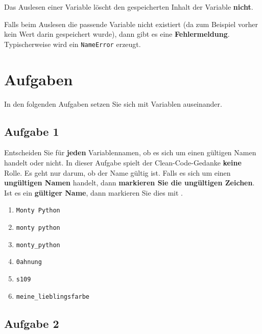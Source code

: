 \begin{important}
	Das Auslesen einer Variable löscht den gespeicherten Inhalt der Variable \textbf{nicht}.
\end{important}

\begin{hinweis}
	Falls beim Auslesen die passende Variable nicht existiert (da zum Beispiel vorher kein Wert darin gespeichert wurde), dann gibt es eine \textbf{Fehlermeldung}. Typischerweise wird ein \texttt{NameError} erzeugt.
\end{hinweis}


\section{Aufgaben}

In den folgenden Aufgaben setzen Sie sich mit Variablen auseinander.

\subsection{Aufgabe 1}

Entscheiden Sie für \textbf{jeden} Variablennamen, ob es sich um einen gültigen Namen handelt oder nicht. In dieser Aufgabe spielt der Clean-Code-Gedanke \textbf{keine} Rolle. Es geht nur darum, ob der Name gültig ist. Falls es sich um einen \textbf{ungültigen Namen} handelt, dann \textbf{markieren Sie die ungültigen Zeichen}. Ist es ein \textbf{gültiger Name}, dann markieren Sie dies mit \cmark.

\begin{multicols}{2}
\begin{enumerate}
\item \lstinline{Monty Python}
\item \lstinline{monty python}
\item \lstinline{monty_python}
\item \lstinline{0ahnung}
\item \lstinline{s109}
\item \lstinline{meine_lieblingsfarbe}
\end{enumerate}
\end{multicols}

\subsection{Aufgabe 2}

